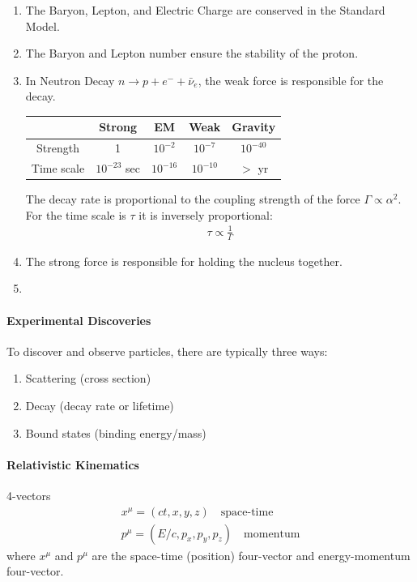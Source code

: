 \documentclass[../main.tex]{subfiles}
\begin{document}
\begin{enumerate}
    \item The Baryon, Lepton, and Electric Charge are conserved in the Standard Model. 
    \item The Baryon and Lepton number ensure the stability of the proton.
    \item In Neutron Decay $n \rightarrow p + e^- + \bar \nu_e$, the weak force is responsible for
    the decay.
\begin{center}
    \begin{tabular}{c|c|c|c|c}
        & Strong & EM & Weak & Gravity \\
        \hline
        Strength & 1 & $10^{-2}$ & $10^{-7}$ & $10^{-40}$ \\
        \hline
        Time scale & $10^{-23}$ sec & $10^{-16}$ & $10^{-10}$ & $>$ yr\\
    \end{tabular}
\end{center}
    The decay rate is proportional to the coupling strength of the force $\Gamma \propto \alpha^2$.
    For the time scale is $\tau$ it is inversely proportional:
    \begin{align*}
        \tau \propto \frac{1}{\Gamma}
    \end{align*}
    \item The strong force is responsible for holding the nucleus together.
    \item 
\end{enumerate}

\paragraph{Experimental Discoveries}

To discover and observe particles, there are typically three ways:
\begin{enumerate}
    \item Scattering (cross section) 
    \item Decay (decay rate or lifetime)
    \item Bound states (binding energy/mass)
\end{enumerate}

\paragraph{Relativistic Kinematics} 4-vectors
\begin{align*}
    x^\mu = (ct, x, y, z) \quad \textrm{space-time} \\
    p^\mu = (E/c, p_x, p_y, p_z) \quad \textrm{momentum}
\end{align*}
where $x^\mu$ and $p^\mu$ are the space-time (position) four-vector and energy-momentum four-vector.
\end{document}
